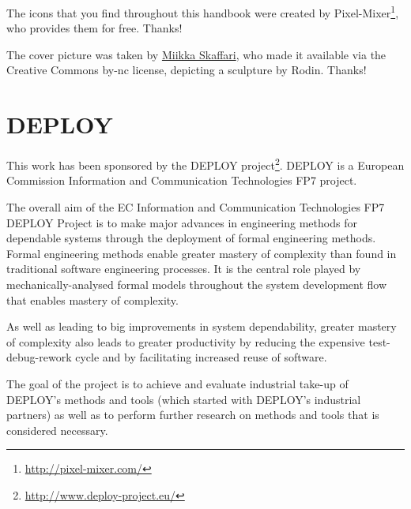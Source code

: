 \documentclass[12pt]{book}
\begin{document}
The icons that you find throughout this handbook were created by Pixel-Mixer\footnote{\url{http://pixel-mixer.com/}}, who provides them for free.  Thanks!

The cover picture was taken by \href{http://www.skaffari.fi/}{Miikka Skaffari}, who made it available via the Creative Commons by-nc license, depicting a sculpture by Rodin.  Thanks!

\section{DEPLOY}
\label{deploy}

This work has been sponsored by the DEPLOY project\footnote{\url{http://www.deploy-project.eu/}}.  DEPLOY is a European Commission Information and Communication Technologies FP7 project.

The overall aim of the EC Information and Communication Technologies FP7 DEPLOY Project is to make major advances in engineering methods for dependable systems through the deployment of formal engineering methods. Formal engineering methods enable greater mastery of complexity than found in traditional software engineering processes. It is the central role played by mechanically-analysed formal models throughout the system development flow that enables mastery of complexity.

As well as leading to big improvements in system dependability, greater mastery of complexity also leads to greater productivity by reducing the expensive test-debug-rework cycle and by facilitating increased reuse of software.

The goal of the project is to achieve and evaluate industrial take-up of DEPLOY's methods and tools (which started with DEPLOY's industrial partners) as well as to perform further research on methods and tools that is considered necessary.



% 







\clearpage
{}
{} 
\printindex
\end{document}
